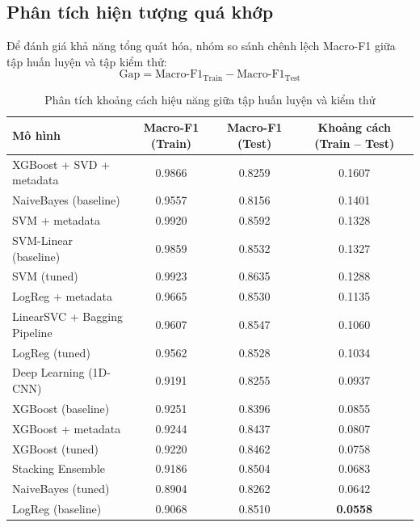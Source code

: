 \subsection{Phân tích hiện tượng quá khớp}
Để đánh giá khả năng tổng quát hóa, nhóm so sánh chênh lệch Macro-F1 giữa tập huấn luyện và tập kiểm thử:
\begin{equation}
\text{Gap} = \text{Macro-F1}_{\text{Train}} - \text{Macro-F1}_{\text{Test}}
\end{equation}

\begin{table}[H]
\centering
\begin{tabular}{|l|c|c|c|}
\hline
\textbf{Mô hình} & \textbf{Macro-F1 (Train)} & \textbf{Macro-F1 (Test)} & \textbf{Khoảng cách (Train -- Test)} \\ \hline
XGBoost + SVD + metadata & 0.9866 & 0.8259 & 0.1607 \\ \hline
NaiveBayes (baseline) & 0.9557 & 0.8156 & 0.1401 \\ \hline
SVM + metadata & 0.9920 & 0.8592 & 0.1328 \\ \hline
SVM-Linear (baseline) & 0.9859 & 0.8532 & 0.1327 \\ \hline
SVM (tuned) & 0.9923 & 0.8635 & 0.1288 \\ \hline
LogReg + metadata & 0.9665 & 0.8530 & 0.1135 \\ \hline
LinearSVC + Bagging Pipeline & 0.9607 & 0.8547 & 0.1060 \\ \hline
LogReg (tuned) & 0.9562 & 0.8528 & 0.1034 \\ \hline
Deep Learning (1D-CNN) & 0.9191 & 0.8255 & 0.0937 \\ \hline
XGBoost (baseline) & 0.9251 & 0.8396 & 0.0855 \\ \hline
XGBoost + metadata & 0.9244 & 0.8437 & 0.0807 \\ \hline
XGBoost (tuned) & 0.9220 & 0.8462 & 0.0758 \\ \hline
Stacking Ensemble & 0.9186 & 0.8504 & 0.0683 \\ \hline
NaiveBayes (tuned) & 0.8904 & 0.8262 & 0.0642 \\ \hline
LogReg (baseline) & 0.9068 & 0.8510 & \textbf{0.0558} \\ \hline
\end{tabular}
\caption{Phân tích khoảng cách hiệu năng giữa tập huấn luyện và kiểm thử}
\label{tab:overfitting_gap}
\end{table}

